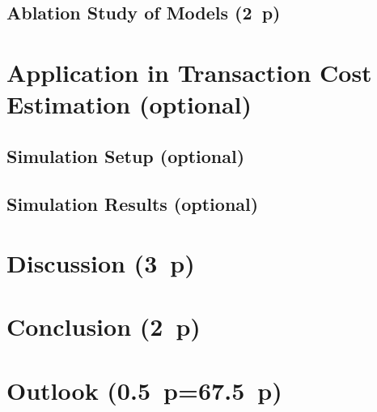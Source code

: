 \subsection{Ablation Study of Models (2~p)}\label{sec:ablation-study}

\newpage
\section{Application in Transaction Cost Estimation (optional)}\label{sec:application}
\subsection{Simulation Setup (optional)}\label{sec:simulation-setup}
\subsection{Simulation Results (optional)}\label{sec:simulation-results}

\newpage
\section{Discussion (3~p)}\label{sec:discussion}

\newpage
\section{Conclusion (2~p)}\label{sec:conclusion}

\newpage
\section{Outlook (0.5~p=67.5~p)}\label{sec:outlook}

